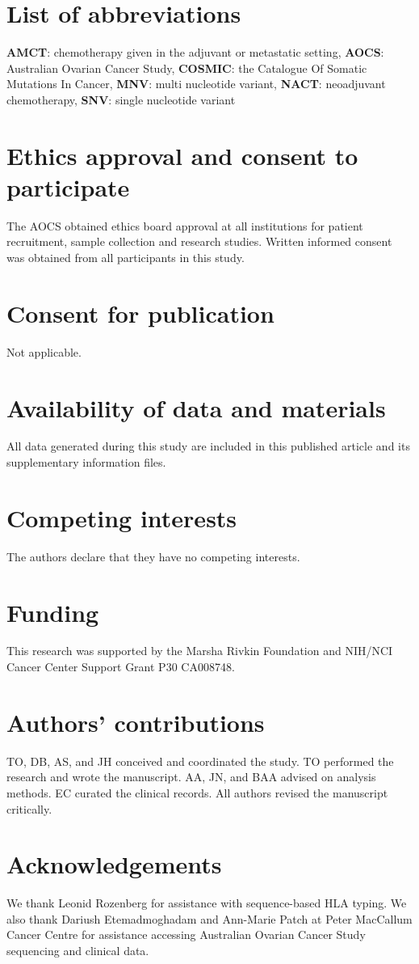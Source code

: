 \section{List of abbreviations}
\textbf{AMCT}: chemotherapy given in the adjuvant or metastatic setting, \textbf{AOCS}: Australian Ovarian Cancer Study, \textbf{COSMIC}: the Catalogue Of Somatic Mutations In Cancer, \textbf{MNV}: multi nucleotide variant, \textbf{NACT}: neoadjuvant chemotherapy, \textbf{SNV}: single nucleotide variant

\section{Ethics approval and consent to participate}
The AOCS obtained ethics board approval at all institutions for patient recruitment, sample collection and research studies. Written informed consent was obtained from all participants in this study.

\section{Consent for publication}
Not applicable.

\section{Availability of data and materials}
All data generated during this study are included in this published article and its supplementary information files.

\section{Competing interests}
The authors declare that they have no competing interests.

\section{Funding}
This research was supported by the Marsha Rivkin Foundation and NIH/NCI Cancer Center Support Grant P30 CA008748.

\section{Authors' contributions}
TO, DB, AS, and JH conceived and coordinated the study. TO performed the research and wrote the manuscript. AA, JN, and BAA advised on analysis methods. EC curated the clinical records. All authors revised the manuscript critically.

\section{Acknowledgements}
We thank Leonid Rozenberg for assistance with sequence-based HLA typing. We also thank Dariush Etemadmoghadam and Ann-Marie Patch at Peter MacCallum Cancer Centre for assistance accessing Australian Ovarian Cancer Study sequencing and clinical data.

